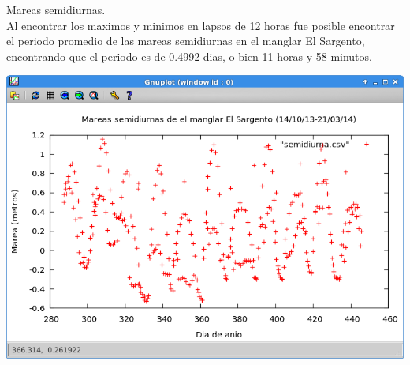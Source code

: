 \documentclass[12pt]{article}
\begin{document}
\begin{large}
Mareas semidiurnas.\\
Al encontrar los maximos y minimos en lapsos de 12 horas fue posible encontrar el periodo promedio de las mareas semidiurnas en el manglar El Sargento, encontrando que el periodo es de 0.4992 dias, o bien 11 horas y 58 minutos.
\end{large}

\begin{center}
\includegraphics[scale=0.8]{semidiurnas.png} 
\end{center}
\end{document}
